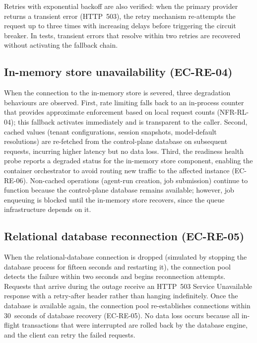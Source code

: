 \documentclass[a4paper,noexaminfo]{sapthesis}
\begin{document}
Retries with exponential backoff are also verified: when the primary
provider returns a transient error (HTTP~503), the retry mechanism
re-attempts the request up to three times with increasing delays before
triggering the circuit breaker.  In tests, transient errors that resolve
within two retries are recovered without activating the fallback chain.

\subsection{In-memory store unavailability (EC-RE-04)}

When the connection to the in-memory store is severed, three degradation
behaviours are observed.  First, rate limiting falls back to an
in-process counter that provides approximate enforcement based on local
request counts (NFR-RL-04); this fallback activates immediately and is
transparent to the caller.  Second, cached values (tenant configurations,
session snapshots, model-default resolutions) are re-fetched from the
control-plane database on subsequent requests, incurring higher latency
but no data loss.  Third, the readiness health probe reports a degraded
status for the in-memory store component, enabling the container
orchestrator to avoid routing new traffic to the affected instance
(EC-RE-06).  Non-cached operations (agent-run creation, job submission)
continue to function because the control-plane database remains
available; however, job enqueuing is blocked until the in-memory store
recovers, since the queue infrastructure depends on it.

\subsection{Relational database reconnection (EC-RE-05)}

When the relational-database connection is dropped (simulated by stopping
the database process for fifteen seconds and restarting it), the
connection pool detects the failure within two seconds and begins
reconnection attempts.  Requests that arrive during the outage receive
an HTTP~503 Service Unavailable response with a retry-after header
rather than hanging indefinitely.  Once the database is available again,
the connection pool re-establishes connections within 30~seconds of
database recovery (EC-RE-05).  No data loss occurs because all in-flight
transactions that were interrupted are rolled back by the database engine,
and the client can retry the failed requests.
\end{document}
